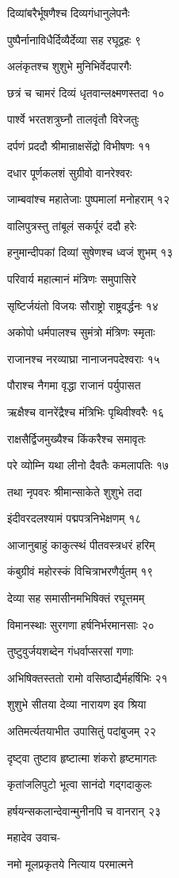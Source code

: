 दिव्यांबरैर्भूषणैश्च दिव्यगंधानुलेपनैः

पुष्पैर्नानाविधैर्दिव्यैर्देव्या सह रघूद्वहः ९

अलंकृतश्च शुशुभे मुनिभिर्वेदपारगैः

छत्रं च चामरं दिव्यं धृतवान्लक्ष्मणस्तदा १०

पार्श्वे भरतशत्रुघ्नौ तालवृंतौ विरेजतुः

दर्पणं प्रददौ श्रीमान्राक्षसेंद्रो विभीषणः ११

दधार पूर्णकलशं सुग्रीवो वानरेश्वरः

जाम्बवांश्च महातेजाः पुष्पमालां मनोहराम् १२

वालिपुत्रस्तु तांबूलं सकर्पूरं ददौ हरेः

हनुमान्दीपकां दिव्यां सुषेणश्च ध्वजं शुभम् १३

परिवार्य महात्मानं मंत्रिणः समुपासिरे

सृष्टिर्जयंतो विजयः सौराष्ट्रो राष्ट्रवर्द्धनः १४

अकोपो धर्मपालश्च सुमंत्रो मंत्रिणः स्मृताः

राजानश्च नरव्याघ्रा नानाजनपदेश्वराः १५

पौराश्च नैगमा वृद्धा राजानं पर्युपासत

ऋक्षैश्च वानरेंद्रैश्च मंत्रिभिः पृथिवीश्वरैः १६

राक्षसैर्द्विजमुख्यैश्च किंकरैश्च समावृतः

परे व्योम्नि यथा लीनो दैवतैः कमलापतिः १७

तथा नृपवरः श्रीमान्साकेते शुशुभे तदा

इंदीवरदलश्यामं पद्मपत्रनिभेक्षणम् १८

आजानुबाहुं काकुत्स्थं पीतवस्त्रधरं हरिम्

कंबुग्रीवं महोरस्कं विचित्राभरणैर्युतम् १९

देव्या सह समासीनमभिषिक्तं रघूत्तमम्

विमानस्थाः सुरगणा हर्षनिर्भरमानसाः २०

तुष्टुवुर्जयशब्देन गंधर्वाप्सरसां गणाः

अभिषिक्तस्ततो रामो वसिष्ठाद्यैर्महर्षिभिः २१

शुशुभे सीतया देव्या नारायण इव श्रिया

अतिमर्त्यतयाभीत उपासितुं पदांबुजम् २२

दृष्ट्वा तुष्टाव हृष्टात्मा शंकरो हृष्टमागतः

कृतांजलिपुटो भूत्वा सानंदो गद्गदाकुलः

हर्षयन्सकलान्देवान्मुनीनपि च वानरान् २३

महादेव उवाच-

नमो मूलप्रकृतये नित्याय परमात्मने

